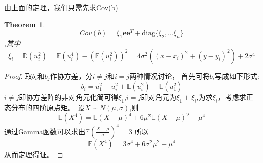 \documentclass[12pt]{article}
\newtheorem{thm}{Theorem}[section]
\theoremstyle{remark}
\begin{document}
由上面的定理，我们只需先求Cov(b)
\begin{thm}
\[
Cov(b)=\xi_1 \bm{e}\bm{e}^T+\text{diag}\{\xi_2,...\xi_n\}
\],其中
\[
\xi_i=\mathbb{D}(u_i^2)=\mathbb{E}(u_i^4)-(\mathbb{E}(u_i^2))^2=4\sigma^2((x-x_i)^2+(y-y_i)^2)+2\sigma^4
\]
\end{thm}
\begin{proof}
取$b_i$和$b_j$作协方差，分$i\neq j$和$i = j$两种情况讨论，
首先可将$b_i$写成如下形式:
\[
b_i=u_1^2-u_i^2+\mathbb{E}(u_i^2)-\mathbb{E}(u_1^2)
\]
$i\neq j$即协方差阵的非对角元化简可得$\xi_1$,$i=j$即对角元为$\xi_1+\xi_i$,为求$\xi_i$，考虑求正态分布的四阶原点矩。
设$X\sim N(\mu,\sigma)$,则
\[
\mathbb{E}(X^4)=\mathbb{E}(X-\mu)^4+6\mu^2\mathbb{E}(X-\mu)^2+\mu^4
\]
通过Gamma函数可以求出$\mathbb{E}(\frac{X-\mu}{\sigma})^4=3$
所以
\[
\mathbb{E}(X^4)=3\sigma^4+6\sigma^2\mu^2+\mu^4
\]
从而定理得证。
\end{proof}
\end{document}
